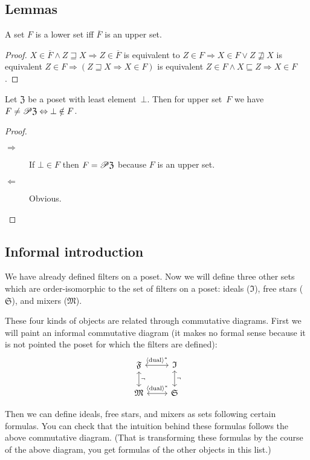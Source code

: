 \subsection{Lemmas}
\begin{lem}
A set $F$ is a lower set iff $\overline{F}$ is an upper set.\end{lem}
\begin{proof}
$X\in\overline{F}\wedge Z\sqsupseteq X\Rightarrow Z\in\overline{F}$
is equivalent to $Z\in F\Rightarrow X\in F\vee Z\nsqsupseteq X$ is
equivalent $Z\in F\Rightarrow(Z\sqsupseteq X\Rightarrow X\in F)$
is equivalent $Z\in F\wedge X\sqsubseteq Z\Rightarrow X\in F$.\end{proof}
\begin{prop}
Let $\mathfrak{Z}$ be a poset with least element~$\bot$. Then for
upper set~$F$ we have $F\ne\mathscr{P}\mathfrak{Z}\Leftrightarrow\bot\notin F$.\end{prop}
\begin{proof}
~
\begin{description}
\item [{$\Rightarrow$}] If $\bot\in F$ then $F=\mathscr{P}\mathfrak{Z}$
because $F$ is an upper set.
\item [{$\Leftarrow$}] Obvious.
\end{description}
\end{proof}

\subsection{Informal introduction}

We have already defined filters on a poset. Now we will define three
other sets which are order-isomorphic to the set of filters on a poset:
ideals ($\mathfrak{I}$), free stars ($\mathfrak{S}$), and mixers
($\mathfrak{M}$).

These four kinds of objects are related through commutative diagrams.
First we will paint an informal commutative diagram (it makes no formal
sense because it is not pointed the poset for which the filters are
defined):\[
\begin{tikzcd}
  \mathfrak{F}
	\arrow[d, leftrightarrow, "\lnot"]
    \arrow[r, leftrightarrow, "\rsupfun{\dual}"]
    & \mathfrak{I} \arrow[d, leftrightarrow, "\lnot"] \\
  \mathfrak{M}
	\arrow[r, leftrightarrow, "\rsupfun{\dual}"]
    & \mathfrak{S}
\end{tikzcd}
\]

Then we can define ideals, free stars, and mixers as sets following
certain formulas. You can check that the intuition behind these formulas
follows the above commutative diagram. (That is transforming these
formulas by the course of the above diagram, you get formulas of the
other objects in this list.)


